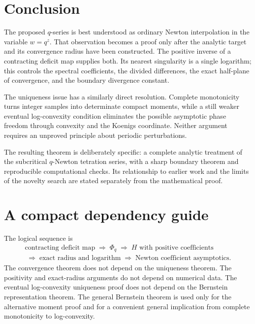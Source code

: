 \documentclass[11pt,letterpaper]{article}
\theoremstyle{definition}\newtheorem{definition}[theorem]{Definition}
\theoremstyle{remark}\newtheorem{remark}[theorem]{Remark}
\newcommand{\PhiQ}{\Phi_q}
\numberwithin{equation}{section}
\begin{document}
\section{Conclusion}

The proposed $q$-series is best understood as ordinary Newton interpolation in the variable $w=q^z$. That observation becomes a proof only after the analytic target and its convergence radius have been constructed. The positive inverse of a contracting deficit map supplies both. Its nearest singularity is a single logarithm; this controls the spectral coefficients, the divided differences, the exact half-plane of convergence, and the boundary divergence constant.

The uniqueness issue has a similarly direct resolution. Complete monotonicity turns integer samples into determinate compact moments, while a still weaker eventual log-convexity condition eliminates the possible asymptotic phase freedom through convexity and the Koenigs coordinate. Neither argument requires an unproved principle about periodic perturbations.

The resulting theorem is deliberately specific: a complete analytic treatment of the subcritical $q$-Newton tetration series, with a sharp boundary theorem and reproducible computational checks. Its relationship to earlier work and the limits of the novelty search are stated separately from the mathematical proof.

\appendix
\section{A compact dependency guide}
The logical sequence is
\[
\begin{gathered}
 \text{contracting deficit map}
 \;\Longrightarrow\;\PhiQ
 \;\Longrightarrow\;H\text{ with positive coefficients}\\
 \;\Longrightarrow\;\text{exact radius and logarithm}
 \;\Longrightarrow\;\text{Newton coefficient asymptotics}.
\end{gathered}
\]
The convergence theorem does not depend on the uniqueness theorem. The positivity and exact-radius arguments do not depend on numerical data. The eventual log-convexity uniqueness proof does not depend on the Bernstein representation theorem. The general Bernstein theorem is used only for the alternative moment proof and for a convenient general implication from complete monotonicity to log-convexity.
\end{document}
